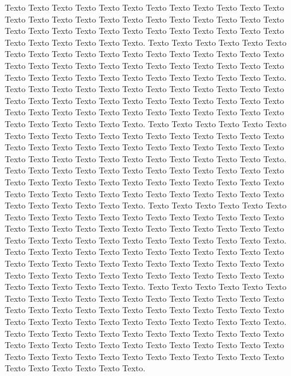 \paragrafo{}
Texto Texto Texto Texto Texto Texto Texto Texto Texto Texto Texto Texto Texto Texto Texto Texto Texto Texto Texto Texto Texto Texto Texto Texto Texto Texto Texto Texto Texto Texto Texto Texto Texto Texto Texto Texto Texto Texto Texto Texto Texto Texto.
\paragrafo{}
Texto Texto Texto Texto Texto Texto Texto Texto Texto Texto Texto Texto Texto Texto Texto Texto Texto Texto Texto Texto Texto Texto Texto Texto Texto Texto Texto Texto Texto Texto Texto Texto Texto Texto Texto Texto Texto Texto Texto Texto Texto Texto.
\paragrafo{}
Texto Texto Texto Texto Texto Texto Texto Texto Texto Texto Texto Texto Texto Texto Texto Texto Texto Texto Texto Texto Texto Texto Texto Texto Texto Texto Texto Texto Texto Texto Texto Texto Texto Texto Texto Texto Texto Texto Texto Texto Texto Texto.
\paragrafo{}
Texto Texto Texto Texto Texto Texto Texto Texto Texto Texto Texto Texto Texto Texto Texto Texto Texto Texto Texto Texto Texto Texto Texto Texto Texto Texto Texto Texto Texto Texto Texto Texto Texto Texto Texto Texto Texto Texto Texto Texto Texto Texto.
\paragrafo{}
Texto Texto Texto Texto Texto Texto Texto Texto Texto Texto Texto Texto Texto Texto Texto Texto Texto Texto Texto Texto Texto Texto Texto Texto Texto Texto Texto Texto Texto Texto Texto Texto Texto Texto Texto Texto Texto Texto Texto Texto Texto Texto.
\paragrafo{}
Texto Texto Texto Texto Texto Texto Texto Texto Texto Texto Texto Texto Texto Texto Texto Texto Texto Texto Texto Texto Texto Texto Texto Texto Texto Texto Texto Texto Texto Texto Texto Texto Texto Texto Texto Texto Texto Texto Texto Texto Texto Texto.
\paragrafo{}
Texto Texto Texto Texto Texto Texto Texto Texto Texto Texto Texto Texto Texto Texto Texto Texto Texto Texto Texto Texto Texto Texto Texto Texto Texto Texto Texto Texto Texto Texto Texto Texto Texto Texto Texto Texto Texto Texto Texto Texto Texto Texto.
\paragrafo{}
Texto Texto Texto Texto Texto Texto Texto Texto Texto Texto Texto Texto Texto Texto Texto Texto Texto Texto Texto Texto Texto Texto Texto Texto Texto Texto Texto Texto Texto Texto Texto Texto Texto Texto Texto Texto Texto Texto Texto Texto Texto Texto.
\paragrafo{}
Texto Texto Texto Texto Texto Texto Texto Texto Texto Texto Texto Texto Texto Texto Texto Texto Texto Texto Texto Texto Texto Texto Texto Texto Texto Texto Texto Texto Texto Texto Texto Texto Texto Texto Texto Texto Texto Texto Texto Texto Texto Texto.
